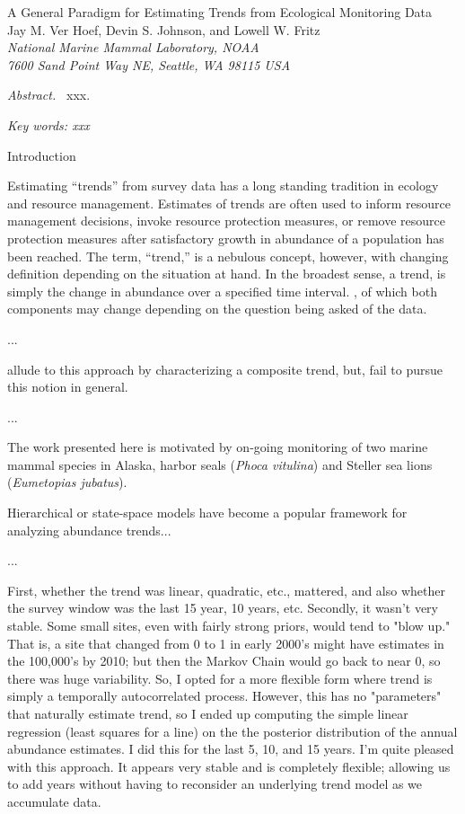\documentclass[12pt,letter,draft]{article}
\begin{document}
\begin{center}
\Large A General Paradigm for Estimating Trends from Ecological Monitoring Data
\bigskip\\
\normalsize
{\sc Jay M. Ver Hoef\footnotemark[1], Devin S. Johnson, and Lowell W. Fritz}\smallskip\\
{\em National Marine Mammal Laboratory, NOAA\\
7600 Sand Point Way NE, Seattle,
WA 98115 USA }\\ \medskip
\end{center}

\raggedright \setlength{\parindent}{0.3in}
\renewcommand{\baselinestretch}{1.7}\normalsize
{}
 \linenumbers

{\em Abstract.\ } xxx.

{\em Key words: xxx}

\centerline{\sc Introduction}

Estimating ``trends'' from survey data has a long standing tradition in ecology and resource management. Estimates of trends are often used to inform resource management decisions, invoke resource protection measures, or remove resource protection measures after satisfactory growth in abundance of a population has been reached. The term, ``trend,'' is a nebulous concept, however, with changing definition depending on the situation at hand. In the broadest sense, a trend, is simply the change in abundance over a specified time interval. , of which both components may change depending on the question being asked of the data.   

...


\citet{Link:2002zd} allude to this approach by characterizing a composite trend, but, fail to pursue this notion in general.


...

The work presented here is motivated by on-going monitoring of two marine mammal species in Alaska, harbor seals ({\it Phoca vitulina}) and Steller sea lions ({\it Eumetopias jubatus}).

Hierarchical or state-space models have become a popular framework for analyzing abundance trends...

...

 First, whether the trend was linear, quadratic, etc., mattered, and also whether the survey window was the last 15 year, 10 years, etc.  Secondly, it wasn't very stable.  Some small sites, even with fairly strong priors, would tend to "blow up."  That is, a site that changed from 0 to 1 in early 2000's might have estimates in the 100,000's by 2010; but then the Markov Chain would go back to near 0, so there was huge variability.  So, I opted for a more flexible form where trend is simply a temporally autocorrelated process.  However, this has no "parameters" that naturally estimate trend, so I ended up computing the simple linear regression (least squares for a line) on the the posterior distribution of the annual abundance estimates.  I did this for the last 5, 10, and 15 years.  I'm quite pleased with this approach.  It appears very stable and is completely flexible; allowing us to add years without having to reconsider an underlying trend model as we accumulate data.
\end{document}
